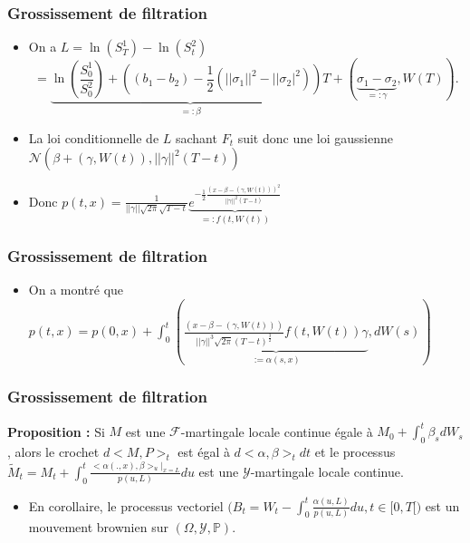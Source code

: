 \documentclass{beamer}
\begin{document}
\begin{frame}
\frametitle{Grossissement de filtration}
\begin{itemize}
\item On a $L = \ln(S^1_T) - \ln(S^2_t)$
\begin{equation*}
= \underbrace{\ln ( \frac{S_0^1}{S_0^2} ) + ( ( b_1 - b_2 ) - \frac{1}{2} (||\sigma_1||^2 - ||\sigma_2|^2 ) ) T}_{=: \beta} + ( \underbrace{\sigma_1 - \sigma_2}_{=: \gamma}, W ( T ) ).
\end{equation*}
\item La loi conditionnelle de $L$ sachant $F_t$ suit donc une loi gaussienne $\mathcal{N} \left( \beta + \left( \gamma, W \left( t \right) \right), ||\gamma||^2 \left( T - t \right) \right)$
\item Donc $p \left( t, x \right) = \frac{1}{ ||\gamma|| \sqrt{2 \pi} \sqrt{T - t}} \underbrace{e^{-\frac{1}{2} \frac{\left( x - \beta - \left( \gamma, W \left( t \right) \right) \right)^2}{||\gamma||^2 \left( T - t \right)}}}_{ =: f \left( t, W \left( t \right) \right)}$
\end{itemize}
\end{frame}

\begin{frame}
\frametitle{Grossissement de filtration}
\begin{itemize}
\item On a montré que $p \left( t, x \right) = p \left( 0, x \right) + \int_0^t \left( \underbrace{ \frac{\left( x - \beta - \left( \gamma, W \left( t \right) \right) \right)}{||\gamma||^3 \sqrt{2 \pi} \left( T - t \right)^{\frac{3}{2}}} f \left( t, W \left( t \right) \right) \gamma}_{:= \alpha(s, x)}, dW \left( s \right) \right)$
\end{itemize}
\end{frame}

\begin{frame}
\frametitle{Grossissement de filtration}
\textbf{Proposition : } Si $M$ est une $\mathcal{F}$-martingale locale continue égale à $ M_0 + \int_{0}^{t} \beta_s dW_s$, alors le crochet $d<M,P>_t$ est égal à $d<\alpha, \beta>_t dt$ et le processus $\tilde{M}_t = M_t + \int_{0}^{t}\frac{<\alpha(.,x),\beta>_u |_{x=L}}{p(u, L)} du$ est une $\mathcal{Y}$-martingale locale continue.
\begin{itemize}
\item En corollaire, le processus vectoriel $\Big(B_t = W_t - \displaystyle \int_{0}^{t} \frac{\alpha(u, L)}{p(u, L)} du, t \in [0, T[ \Big)$ est un mouvement brownien sur $(\Omega, \mathcal{Y}, \mathbb{P})$. 
\end{itemize}
\end{frame}
\end{document}
